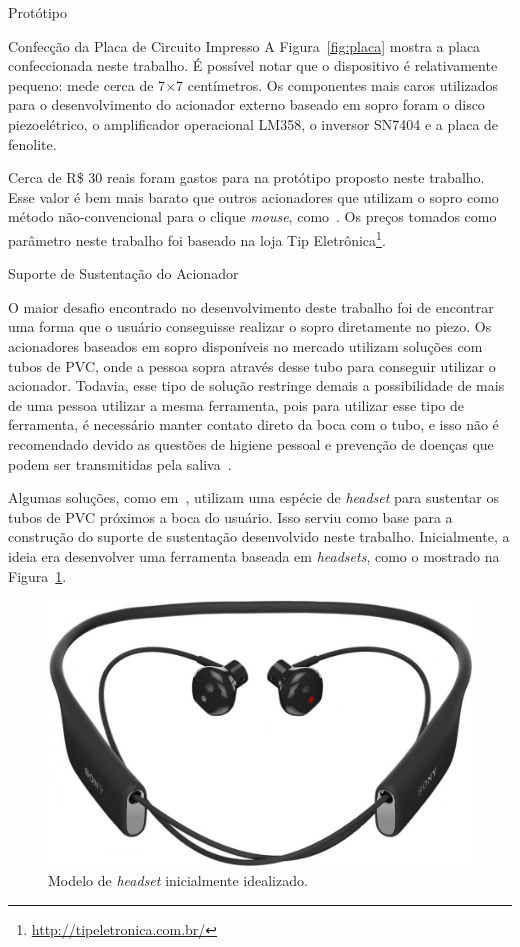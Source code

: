 \begin{chapter}{Protótipo}
\begin{section}{Confecção da Placa de Circuito Impresso}
A Figura~\ref{fig:placa} mostra a placa confeccionada neste trabalho. É possível
notar que o dispositivo é relativamente pequeno: mede cerca de 7$\times$7
centímetros. Os componentes mais caros utilizados para o desenvolvimento do
acionador externo baseado em sopro foram o disco piezoelétrico, o amplificador
operacional LM358, o inversor SN7404 e a placa de fenolite. 

Cerca de R\$ 30 reais
foram gastos para na protótipo proposto neste trabalho. Esse valor é bem mais
barato que outros acionadores que utilizam o sopro como método não-convencional
para o clique \textit{mouse}, como~\cite{SipPuff}. Os preços tomados como
parâmetro neste trabalho foi baseado na loja Tip
Eletrônica\footnote{\url{http://tipeletronica.com.br/}}. 

\end{section}


\begin{section}{Suporte de Sustentação do Acionador}

O maior desafio encontrado no desenvolvimento deste trabalho foi de encontrar
uma forma que o usuário conseguisse realizar o sopro diretamente no piezo. Os
acionadores baseados em sopro disponíveis no mercado utilizam soluções com tubos
de PVC, onde a pessoa sopra através desse tubo para conseguir utilizar o
acionador. Todavia, esse tipo de solução restringe demais a possibilidade de
mais de uma pessoa utilizar a mesma ferramenta, pois para utilizar esse tipo de
ferramenta, é necessário manter contato direto da boca com o tubo, e isso não é
recomendado devido as questões de higiene pessoal e prevenção de doenças que
podem ser transmitidas pela saliva~\cite{Li2000}.

Algumas soluções, como em~\cite{CorpPuff}, utilizam uma espécie de 
\textit{headset} para sustentar os tubos de PVC próximos a boca do usuário. Isso
serviu como base para a construção do suporte de sustentação desenvolvido neste
trabalho. Inicialmente, a ideia era desenvolver uma ferramenta baseada em
\textit{headsets}, como o mostrado na Figura~\ref{fig:headset}.

\begin{figure}[!h]
	\centering
	\begin{minipage}[c]{\textwidth}
	\centering
	\includegraphics[width=0.3\linewidth]{fig/heaset}
	\caption{Modelo de \textit{headset} inicialmente idealizado.}
	\label{fig:headset}
	\end{minipage}
\end{figure} 


\end{section}
\end{chapter}
